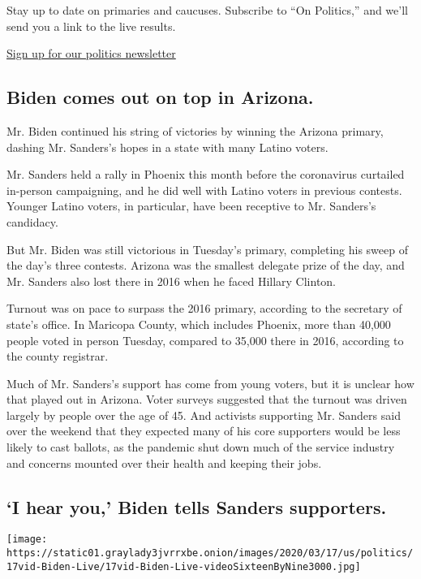 Stay up to date on primaries and caucuses. Subscribe to ``On Politics,''
and we'll send you a link to the live results.

\href{https://www.nytimes3xbfgragh.onion/newsletters/politics}{Sign up
for our politics newsletter}

\hypertarget{biden-comes-out-on-top-in-arizona}{%
\subsection{Biden comes out on top in
Arizona.}\label{biden-comes-out-on-top-in-arizona}}

Mr. Biden continued his string of victories by winning the Arizona
primary, dashing Mr. Sanders's hopes in a state with many Latino voters.

Mr. Sanders held a rally in Phoenix this month before the coronavirus
curtailed in-person campaigning, and he did well with Latino voters in
previous contests. Younger Latino voters, in particular, have been
receptive to Mr. Sanders's candidacy.

But Mr. Biden was still victorious in Tuesday's primary, completing his
sweep of the day's three contests. Arizona was the smallest delegate
prize of the day, and Mr. Sanders also lost there in 2016 when he faced
Hillary Clinton.

Turnout was on pace to surpass the 2016 primary, according to the
secretary of state's office. In Maricopa County, which includes Phoenix,
more than 40,000 people voted in person Tuesday, compared to 35,000
there in 2016, according to the county registrar.

Much of Mr. Sanders's support has come from young voters, but it is
unclear how that played out in Arizona. Voter surveys suggested that the
turnout was driven largely by people over the age of 45. And activists
supporting Mr. Sanders said over the weekend that they expected many of
his core supporters would be less likely to cast ballots, as the
pandemic shut down much of the service industry and concerns mounted
over their health and keeping their jobs.

\hypertarget{i-hear-you-biden-tells-sanders-supporters}{%
\subsection{`I hear you,' Biden tells Sanders
supporters.}\label{i-hear-you-biden-tells-sanders-supporters}}

\texttt{[image: https://static01.graylady3jvrrxbe.onion/images/2020/03/17/us/politics/17vid-Biden-Live/17vid-Biden-Live-videoSixteenByNine3000.jpg]}


